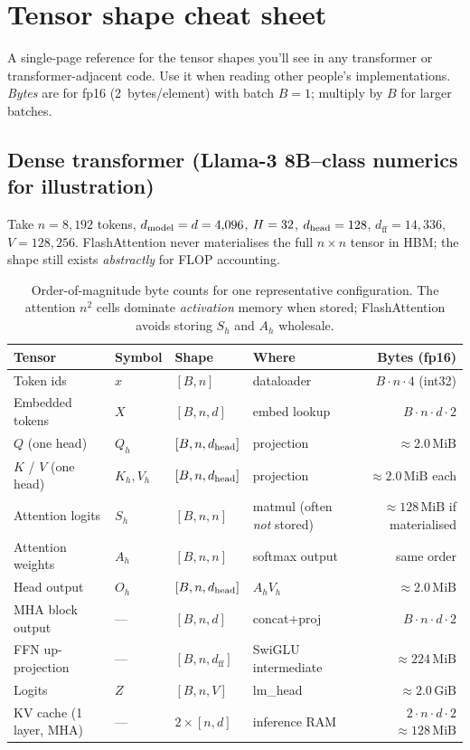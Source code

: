 \chapter{Tensor shape cheat sheet}
\label{app:shapes}

A single-page reference for the tensor shapes you'll see in any transformer
or transformer-adjacent code. Use it when reading other people's
implementations. \emph{Bytes} are for fp16 (2~bytes/element) with batch
\(B=1\); multiply by \(B\) for larger batches.

\section*{Dense transformer (Llama-3 8B--class numerics for illustration)}

Take \(n = 8{,}192\) tokens, \(d_{\text{model}} = d = 4{,}096\), \(H = 32\),
\(d_{\text{head}} = 128\), \(d_{\text{ff}} = 14{,}336\), \(V = 128{,}256\). FlashAttention
never materialises the full \(n\times n\) tensor in HBM; the shape still
exists \emph{abstractly} for FLOP accounting.

\begin{table}[htbp]
\centering
\scriptsize
\setlength{\tabcolsep}{3pt}
\begin{tabular}{@{}llllr@{}}
\toprule
Tensor & Symbol & Shape & Where & Bytes (fp16) \\
\midrule
Token ids & \(x\) & \([B, n]\) & dataloader & \(B\cdot n\cdot 4\) (int32) \\
Embedded tokens & \(X\) & \([B, n, d]\) & embed lookup & \(B\cdot n\cdot d\cdot 2\) \\
\(Q\) (one head) & \(Q_h\) & \([B, n, d_{\text{head}}]\) & projection & \(\approx 2.0\,\mathrm{MiB}\) \\
\(K\) / \(V\) (one head) & \(K_h, V_h\) & \([B, n, d_{\text{head}}]\) & projection & \(\approx 2.0\,\mathrm{MiB}\) each \\
Attention logits & \(S_h\) & \([B, n, n]\) & matmul (often \emph{not} stored) & \(\approx 128\,\mathrm{MiB}\) if materialised \\
Attention weights & \(A_h\) & \([B, n, n]\) & softmax output & same order \\
Head output & \(O_h\) & \([B, n, d_{\text{head}}]\) & \(A_h V_h\) & \(\approx 2.0\,\mathrm{MiB}\) \\
MHA block output & --- & \([B, n, d]\) & concat\(+\)proj & \(B\cdot n\cdot d\cdot 2\) \\
FFN up-projection & --- & \([B, n, d_{\text{ff}}]\) & SwiGLU intermediate & \(\approx 224\,\mathrm{MiB}\) \\
Logits & \(Z\) & \([B, n, V]\) & lm\_head & \(\approx 2.0\,\mathrm{GiB}\) \\
\midrule
KV cache (1 layer, MHA) & --- & \(2 \times [n, d]\) & inference RAM & \(2\cdot n\cdot d\cdot 2\) \(\approx 128\,\mathrm{MiB}\) \\
\bottomrule
\end{tabular}
\caption{Order-of-magnitude byte counts for one representative configuration.
The attention \(n^{2}\) cells dominate \emph{activation} memory when stored;
FlashAttention avoids storing \(S_h\) and \(A_h\) wholesale.}
\label{tab:shape-master}
\end{table}

